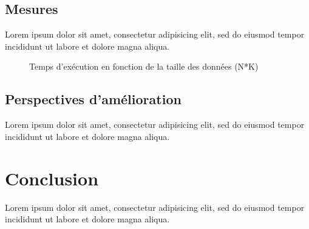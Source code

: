 \documentclass[12pt]{article}
\begin{document}
\subsection{Mesures}

Lorem ipsum dolor sit amet, consectetur adipisicing elit, sed do eiusmod tempor
incididunt ut labore et dolore magna aliqua.

\begin{figure}
    \begin{center}
        \caption{Temps d'exécution en fonction de la taille des données (N*K)}
        \label{time-to-data-size}
    \end{center}
\end{figure}

\subsection{Perspectives d'amélioration}

Lorem ipsum dolor sit amet, consectetur adipisicing elit, sed do eiusmod tempor
incididunt ut labore et dolore magna aliqua.

\section{Conclusion}

Lorem ipsum dolor sit amet, consectetur adipisicing elit, sed do eiusmod tempor
incididunt ut labore et dolore magna aliqua.
\end{document}

